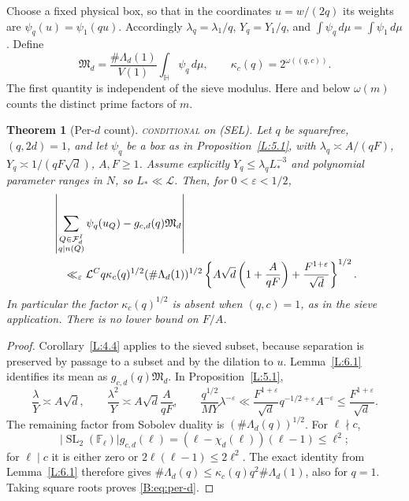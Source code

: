 \documentclass[10pt,reqno]{amsart}
\newtheorem{theorem}{Theorem}[section]
\theoremstyle{definition}
\numberwithin{equation}{section}
\newcommand{\HH}{\mathbb H}
\newcommand{\cL}{\mathcal L}
\newcommand{\cF}{\mathcal F}
\DeclareMathOperator{\SL}{SL}
\newcommand{\status}[1]{\textup{\textsc{#1}}}
\begin{document}
Choose a fixed physical box, so that in the coordinates \(u=w/(2q)\)
its weights are \(\psi_q(u)=\psi_1(qu)\). Accordingly
\(\lambda_q=\lambda_1/q\), \(Y_q=Y_1/q\), and
\(\int\psi_q\,d\mu=\int\psi_1\,d\mu\). Define
\[
 \mathfrak M_d=\frac{\#\Lambda_d(1)}{V(1)}\int_{\HH}\psi_q\,d\mu,
 \qquad \kappa_c(q)=2^{\omega((q,c))}.
\]
The first quantity is independent of the sieve modulus. Here and below
\(\omega(m)\) counts the distinct prime factors of \(m\).

\begin{theorem}[Per-\(d\) count]\label{L:6.2}
\status{conditional} on (SEL). Let \(q\) be squarefree, \((q,2d)=1\),
and let \(\psi_q\) be a box as in Proposition~\ref{L:5.1}, with
\(\lambda_q\asymp A/(qF)\), \(Y_q\asymp1/(qF\sqrt d)\), \(A,F\ge1\).
Assume explicitly $Y_q\le\lambda_q L_*^{-3}$ and polynomial parameter
ranges in $N$, so $L_*\ll\cL$.
Then, for \(0<\varepsilon<1/2\),
\begin{align}\label{B:eq:per-d}
 &\left|\sum_{\substack{Q\in\cF_d^I\\q\mid n(Q)}}\psi_q(u_Q)
             -g_{c,d}(q)\mathfrak M_d\right|\notag\\
 &\quad\ll_\varepsilon \cL^C q\kappa_c(q)^{1/2}(\#\Lambda_d(1))^{1/2}
   \left\{A\sqrt d\left(1+\frac A{qF}\right)
                     +\frac{F^{1+\varepsilon}}{\sqrt d}\right\}^{1/2}.
\end{align}
In particular the factor \(\kappa_c(q)^{1/2}\) is absent when \((q,c)=1\),
as in the sieve application. There is no lower bound on \(F/A\).
\end{theorem}
\begin{proof}
Corollary~\ref{L:4.4} applies to the sieved subset, because separation
is preserved by passage to a subset and by the dilation to \(u\).
Lemma~\ref{L:6.1} identifies its mean as \(g_{c,d}(q)\mathfrak M_d\).
In Proposition~\ref{L:5.1},
\[
 \frac\lambda Y\asymp A\sqrt d,\qquad
 \frac{\lambda^2}Y\asymp A\sqrt d\frac A{qF},\qquad
 \frac{q^{1/2}}{MY}\lambda^{-\varepsilon}
 \ll\frac{F^{1+\varepsilon}}{\sqrt d}
                 q^{-1/2+\varepsilon}A^{-\varepsilon}
 \le\frac{F^{1+\varepsilon}}{\sqrt d}.
\]
The remaining factor from Sobolev duality is \((\#\Lambda_d(q))^{1/2}\).
For \(\ell\nmid c\),
\[
 |\SL_2(\mathbb F_\ell)|g_{c,d}(\ell)
       =(\ell-\chi_d(\ell))(\ell-1)\le\ell^2;
\]
for \(\ell\mid c\) it is either zero or \(2\ell(\ell-1)\le2\ell^2\).
The exact identity from Lemma~\ref{L:6.1} therefore gives
\(\#\Lambda_d(q)\le\kappa_c(q)q^2\#\Lambda_d(1)\), also for \(q=1\).
Taking square roots proves \eqref{B:eq:per-d}.
\end{proof}
\end{document}
